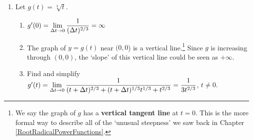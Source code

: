 \begin{enumerate}
\setcounter{enumi}{\value{HW}}


\item Let  $g(t) = \sqrt[3]{t}$.  

\begin{enumerate}

\item $g'(0) = \displaystyle{ \lim_{\Delta t \rightarrow 0} \dfrac{1}{(\Delta t)^{2/3}}   =  \infty}$

\smallskip

        
\item  The graph of $y = g(t)$ near $(0,0$) is a vertical line.\footnote{We say the graph of $g$ has a  \textbf{vertical tangent line} at $t=0$.  This is the more formal way to describe all of the `unusual steepness' we saw back in Chapter \ref{RootRadicalPowerFunctions}.}  Since $g$ is increasing through $(0,0)$, the `slope' of this vertical line could be seen as $+ \infty$. 

\smallskip

\item  Find and simplify  $g'(t) = \displaystyle{ \lim_{\Delta t \rightarrow 0} \dfrac{1}{(t+\Delta t)^{2/3} + (t+\Delta t)^{1/3} t^{1/3} + t^{2/3}} = \dfrac{1}{3 t^{2/3}} }$, $t \neq 0$.

\end{enumerate}

\setcounter{HW}{\value{enumi}}
\end{enumerate}

